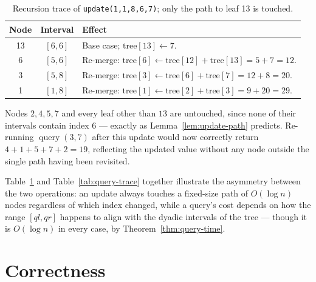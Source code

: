 \documentclass[
  11pt,
  a4paper,
  twoside=false,
  numbers=noenddot,
  headings=big,
  parskip=half,
  toc=bibliography,
  toc=listof,
  bibliography=totoc
]{scrreprt}
\newcommand{\Oh}[1]{O\!\left(#1\right)}
\DeclareMathOperator{\Qry}{query}
\newcommand{\tblhead}[1]{\textbf{\sffamily #1}}
\begin{document}
\begin{table}[h]
\centering
\caption{Recursion trace of \texttt{update(1,1,8,6,7)}; only the path to leaf 13 is touched.}
\label{tab:update-trace}
\begin{tabular}{ccp{8.4cm}}
\toprule
\tblhead{Node} & \tblhead{Interval} & \tblhead{Effect} \\
\midrule
13 & $[6,6]$ & Base case; $\text{tree}[13]\gets 7$. \\
6  & $[5,6]$ & Re-merge: $\text{tree}[6]\gets \text{tree}[12]+\text{tree}[13]=5+7=12$. \\
3  & $[5,8]$ & Re-merge: $\text{tree}[3]\gets \text{tree}[6]+\text{tree}[7]=12+8=20$. \\
1  & $[1,8]$ & Re-merge: $\text{tree}[1]\gets \text{tree}[2]+\text{tree}[3]=9+20=29$. \\
\bottomrule
\end{tabular}
\end{table}

Nodes $2,4,5,7$ and every leaf other than $13$ are untouched, since none of their intervals contain index $6$ --- exactly as Lemma~\ref{lem:update-path} predicts. Re-running $\Qry(3,7)$ after this update would now correctly return $4+1+5+7+2=19$, reflecting the updated value without any node outside the single path having been revisited.

\begin{remark}
Table~\ref{tab:update-trace} and Table~\ref{tab:query-trace} together illustrate the asymmetry between the two operations: an update always touches a fixed-size path of $\Oh{\log n}$ nodes regardless of which index changed, while a query's cost depends on how the range $[ql,qr]$ happens to align with the dyadic intervals of the tree --- though it is $\Oh{\log n}$ in every case, by Theorem~\ref{thm:query-time}.
\end{remark}


\chapter{Correctness}
\label{ch:correctness}
\end{document}
